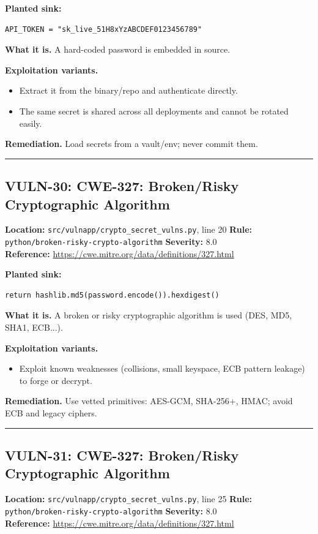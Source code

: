\documentclass[11pt,a4paper]{article}
\begin{document}
\noindent\textbf{Planted sink:}
\begin{lstlisting}
API_TOKEN = "sk_live_51H8xYzABCDEF0123456789"
\end{lstlisting}
\noindent\textbf{What it is.} A hard-coded password is embedded in source.

\noindent\textbf{Exploitation variants.}
\begin{itemize}[leftmargin=1.4em,itemsep=1pt,topsep=2pt]
\item Extract it from the binary/repo and authenticate directly.
\item The same secret is shared across all deployments and cannot be rotated easily.
\end{itemize}
\noindent\textbf{Remediation.} Load secrets from a vault/env; never commit them.

\vspace{4pt}\hrule\vspace{6pt}
\subsection{VULN-30: CWE-327: Broken/Risky Cryptographic Algorithm}
\noindent\textbf{Location:} \texttt{src/vulnapp/crypto\_secret\_vulns.py}, line 20 \quad \textbf{Rule:} \texttt{python/broken-risky-crypto-algorithm} \quad \textbf{Severity:} 8.0
\\ \textbf{Reference:} \url{https://cwe.mitre.org/data/definitions/327.html}

\noindent\textbf{Planted sink:}
\begin{lstlisting}
return hashlib.md5(password.encode()).hexdigest()
\end{lstlisting}
\noindent\textbf{What it is.} A broken or risky cryptographic algorithm is used (DES, MD5, SHA1, ECB...).

\noindent\textbf{Exploitation variants.}
\begin{itemize}[leftmargin=1.4em,itemsep=1pt,topsep=2pt]
\item Exploit known weaknesses (collisions, small keyspace, ECB pattern leakage) to forge or decrypt.
\end{itemize}
\noindent\textbf{Remediation.} Use vetted primitives: AES-GCM, SHA-256+, HMAC; avoid ECB and legacy ciphers.

\vspace{4pt}\hrule\vspace{6pt}
\subsection{VULN-31: CWE-327: Broken/Risky Cryptographic Algorithm}
\noindent\textbf{Location:} \texttt{src/vulnapp/crypto\_secret\_vulns.py}, line 25 \quad \textbf{Rule:} \texttt{python/broken-risky-crypto-algorithm} \quad \textbf{Severity:} 8.0
\\ \textbf{Reference:} \url{https://cwe.mitre.org/data/definitions/327.html}
\end{document}
